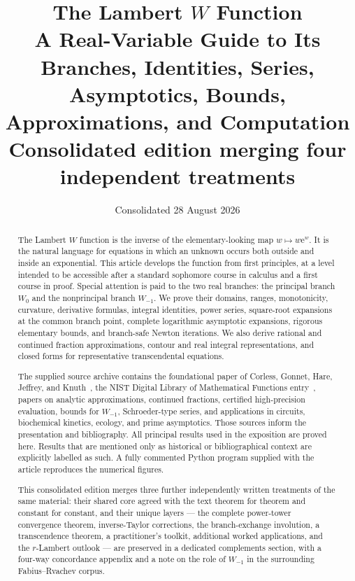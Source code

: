 \documentclass[11pt]{article}
\title{\textbf{The Lambert \(W\) Function}\\
\large A Real-Variable Guide to Its Branches, Identities, Series,
Asymptotics, Bounds, Approximations, and Computation\\[0.5em]
\normalsize Consolidated edition merging four independent treatments}
\author{}
\date{Consolidated 28 August 2026}
\theoremstyle{remark}
\newcommand{\Wz}{W_0}
\newcommand{\Wm}{W_{-1}}
\newcommand{\ee}{\mathrm e}
\begin{document}
\maketitle

\begin{abstract}
The Lambert \(W\) function is the inverse of the elementary-looking map
\(w\mapsto w\ee^w\).  It is the natural language for equations in which an
unknown occurs both outside and inside an exponential.  This article develops
the function from first principles, at a level intended to be accessible after
a standard sophomore course in calculus and a first course in proof.  Special
attention is paid to the two real branches: the principal branch \(\Wz\) and
the nonprincipal branch \(\Wm\).  We prove their domains, ranges,
monotonicity, curvature, derivative formulas, integral identities, power
series, square-root expansions at the common branch point, complete
logarithmic asymptotic expansions, rigorous elementary bounds, and
branch-safe Newton iterations.  We also derive rational and continued
fraction approximations, contour and real integral representations, and
closed forms for representative transcendental equations.

The supplied source archive contains the foundational paper of Corless,
Gonnet, Hare, Jeffrey, and Knuth~\cite{corless1996}, the NIST Digital Library
of Mathematical Functions entry~\cite{dlmf}, papers on analytic approximations, continued fractions,
certified high-precision evaluation, bounds for \(\Wm\), Schroeder-type
series, and applications in circuits, biochemical kinetics, ecology, and
prime asymptotics.  Those sources inform the presentation and bibliography.
All principal results used in the exposition are proved here.  Results that
are mentioned only as historical or bibliographical context are explicitly
labelled as such.  A fully commented Python program supplied with the article
reproduces the numerical figures.

This consolidated edition merges three further independently written treatments of the same material: their shared core agreed with the text theorem for theorem and constant for constant, and their unique layers --- the complete power-tower convergence theorem, inverse-Taylor corrections, the branch-exchange involution, a transcendence theorem, a practitioner's toolkit, additional worked applications, and the \(r\)-Lambert outlook --- are preserved in a dedicated complements section, with a four-way concordance appendix and a note on the role of \(W_{-1}\) in the surrounding Fabius--Rvachev corpus.
\end{abstract}
\end{document}
